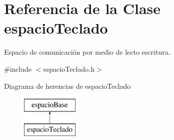 \hypertarget{classespacio_teclado}{}\section{Referencia de la Clase espacio\+Teclado}
\label{classespacio_teclado}


Espacio de comunicación por medio de lecto escritura.  




{\ttfamily \#include $<$espacio\+Teclado.\+h$>$}

Diagrama de herencias de espacio\+Teclado\begin{figure}[H]
\begin{center}
\leavevmode
\includegraphics[height=2.000000cm]{classespacio_teclado}
\end{center}
\end{figure}
